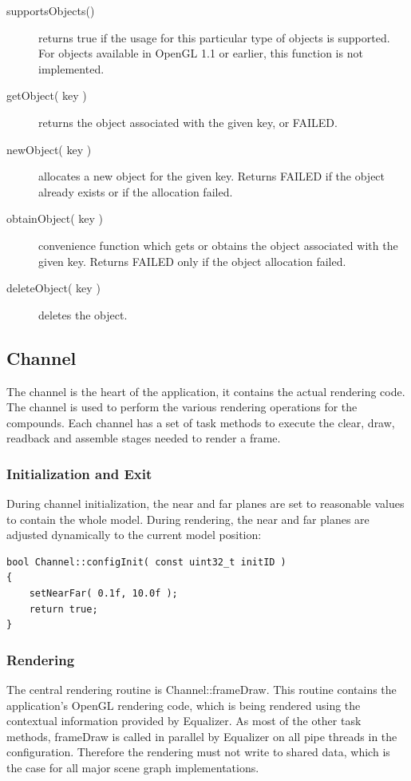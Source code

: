 \documentclass[10pt,a4]{scrartcl}
\begin{document}
\begin{description}
\item[supportsObjects()] returns true if the usage for this particular
  type of objects is supported. For objects available in OpenGL 1.1 or
  earlier, this function is not implemented.
\item[getObject( key )] returns the object associated with the given
  key, or FAILED.
\item[newObject( key )] allocates a new object for the given
  key. Returns FAILED if the object already exists or if the allocation
  failed.
\item[obtainObject( key )] convenience function which gets or obtains
  the object associated with the given key. Returns FAILED only if the
  object allocation failed.
\item[deleteObject( key )] deletes the object.
\end{description}


\subsection{Channel}

The channel is the heart of the application, it contains the actual
rendering code. The channel is used to perform the various rendering
operations for the compounds. Each channel has a set of task methods to
execute the clear, draw, readback and assemble stages needed to render a
frame.

\subsubsection{Initialization and Exit}

During channel initialization, the near and far planes are set to
reasonable values to contain the whole model. During rendering, the near
and far planes are adjusted dynamically to the current model position:

{\footnotesize\begin{lstlisting}
bool Channel::configInit( const uint32_t initID )
{
    setNearFar( 0.1f, 10.0f );
    return true;
}
\end{lstlisting}}

\subsubsection{Rendering}

The central rendering routine is \textsf{Channel::frameDraw}. This
routine contains the application's OpenGL rendering code, which is being
rendered using the contextual information provided by Equalizer. As most
of the other task methods, \textsf{frameDraw} is called in parallel by
Equalizer on all pipe threads in the configuration. Therefore the
rendering must not write to shared data, which is the case for all major
scene graph implementations.
\end{document}
